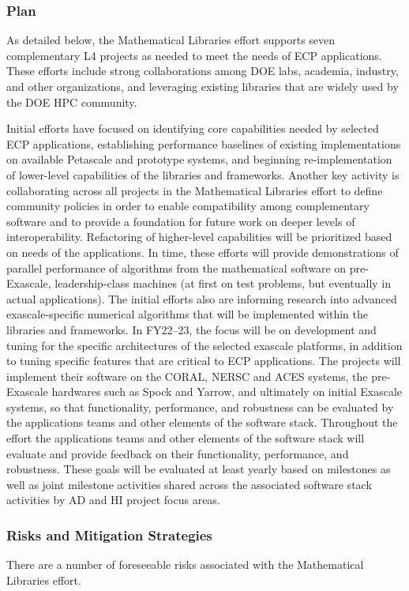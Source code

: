 \subsubsection{Plan}
As detailed below, the Mathematical Libraries effort supports seven complementary L4 projects as needed to meet the needs of ECP applications. These efforts include strong collaborations among DOE labs, academia, industry, and other organizations, and leveraging existing libraries that are widely used by the DOE HPC community. 

Initial efforts have focused on identifying core capabilities needed by selected ECP applications, establishing performance baselines of existing implementations on available Petascale and prototype systems, and beginning re-implementation of lower-level capabilities of the libraries and frameworks. Another key activity is collaborating across all projects in the Mathematical Libraries effort to define community policies in order to enable compatibility among complementary software and to provide a foundation for future work on deeper levels of interoperability. Refactoring of higher-level capabilities will be prioritized based on needs of the applications. In time, these efforts will provide demonstrations of parallel performance of algorithms from the mathematical software on pre-Exascale, leadership-class machines (at first on test problems, but eventually in actual applications). The initial efforts also are informing research into advanced exascale-specific numerical algorithms that will be implemented within the libraries and frameworks. In FY22–23, the focus will be on development and tuning for the specific architectures of the selected exascale platforms, in addition to tuning specific features that are critical to ECP applications. The projects will implement their software on the CORAL, NERSC and ACES systems,
the pre-Exascale hardwares such as Spock and Yarrow,
and ultimately on initial Exascale systems, so that functionality, performance, and robustness can be evaluated by the applications teams and other elements of the software stack. Throughout the effort the applications teams and other elements of the software stack will evaluate and provide feedback on their functionality, performance, and robustness. These goals will be evaluated at least yearly based on milestones as well as joint milestone activities shared across the associated software stack activities by AD and HI project focus areas.


\subsubsection{Risks and Mitigation Strategies}
There are a number of foreseeable risks associated with the Mathematical Libraries effort.

